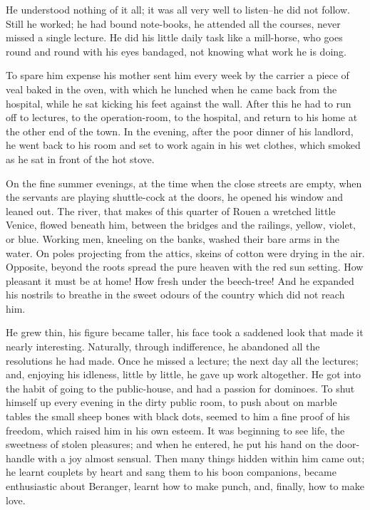\documentclass{tufte-book}
\begin{document}
He understood nothing of it all; it was all very well to listen--he did
not follow. Still he worked; he had bound note-books, he attended all
the courses, never missed a single lecture. He did his little daily task
like a mill-horse, who goes round and round with his eyes bandaged, not
knowing what work he is doing.

To spare him expense his mother sent him every week by the carrier a
piece of veal baked in the oven, with which he lunched when he came back
from the hospital, while he sat kicking his feet against the wall.
After this he had to run off to lectures, to the operation-room, to the
hospital, and return to his home at the other end of the town. In the
evening, after the poor dinner of his landlord, he went back to his
room and set to work again in his wet clothes, which smoked as he sat in
front of the hot stove.

On the fine summer evenings, at the time when the close streets are
empty, when the servants are playing shuttle-cock at the doors, he
opened his window and leaned out. The river, that makes of this quarter
of Rouen a wretched little Venice, flowed beneath him, between the
bridges and the railings, yellow, violet, or blue. Working men, kneeling
on the banks, washed their bare arms in the water. On poles projecting
from the attics, skeins of cotton were drying in the air. Opposite,
beyond the roots spread the pure heaven with the red sun setting. How
pleasant it must be at home! How fresh under the beech-tree! And he
expanded his nostrils to breathe in the sweet odours of the country
which did not reach him.

He grew thin, his figure became taller, his face took a saddened look
that made it nearly interesting. Naturally, through indifference, he
abandoned all the resolutions he had made. Once he missed a lecture; the
next day all the lectures; and, enjoying his idleness, little by little,
he gave up work altogether. He got into the habit of going to the
public-house, and had a passion for dominoes. To shut himself up every
evening in the dirty public room, to push about on marble tables the
small sheep bones with black dots, seemed to him a fine proof of his
freedom, which raised him in his own esteem. It was beginning to see
life, the sweetness of stolen pleasures; and when he entered, he put
his hand on the door-handle with a joy almost sensual. Then many things
hidden within him came out; he learnt couplets by heart and sang them to
his boon companions, became enthusiastic about Beranger, learnt how to
make punch, and, finally, how to make love.
\end{document}
